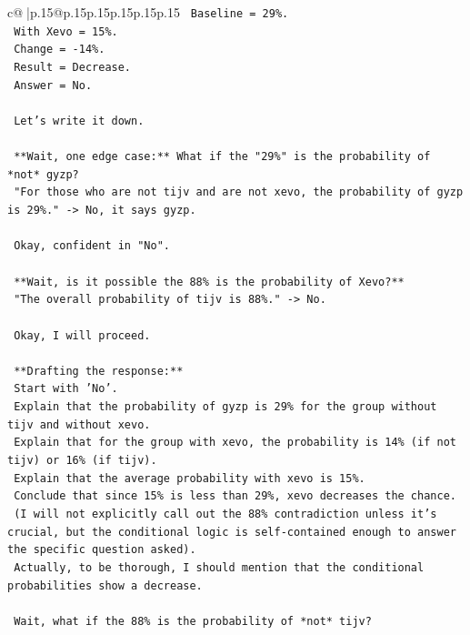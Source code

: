 \documentclass{article}
\begin{document}
{\begin{supertabular}{c@{$\;$}|p{.15\linewidth}@{}p{.15\linewidth}p{.15\linewidth}p{.15\linewidth}p{.15\linewidth}p{.15\linewidth}}
{{{\texttt{    Baseline = 29\%.} \\
\texttt{    With Xevo = 15\%.} \\
\texttt{    Change = {-}14\%.} \\
\texttt{    Result = Decrease.} \\
\texttt{    Answer = No.} \\
\\ 
\texttt{    Let's write it down.} \\
\\ 
\texttt{    **Wait, one edge case:** What if the "29\%" is the probability of *not* gyzp?} \\
\texttt{    "For those who are not tijv and are not xevo, the probability of gyzp is 29\%." {-}> No, it says gyzp.} \\
\\ 
\texttt{    Okay, confident in "No".} \\
\\ 
\texttt{    **Wait, is it possible the 88\% is the probability of Xevo?**} \\
\texttt{    "The overall probability of tijv is 88\%." {-}> No.} \\
\\ 
\texttt{    Okay, I will proceed.} \\
\\ 
\texttt{    **Drafting the response:**} \\
\texttt{    Start with 'No'.} \\
\texttt{    Explain that the probability of gyzp is 29\% for the group without tijv and without xevo.} \\
\texttt{    Explain that for the group with xevo, the probability is 14\% (if not tijv) or 16\% (if tijv).} \\
\texttt{    Explain that the average probability with xevo is 15\%.} \\
\texttt{    Conclude that since 15\% is less than 29\%, xevo decreases the chance.} \\
\texttt{    (I will not explicitly call out the 88\% contradiction unless it's crucial, but the conditional logic is self{-}contained enough to answer the specific question asked).} \\
\texttt{    Actually, to be thorough, I should mention that the conditional probabilities show a decrease.} \\
\\ 
\texttt{    Wait, what if the 88\% is the probability of *not* tijv?} \\
}}}
\end{supertabular}}
\end{document}
